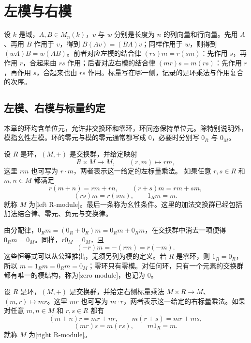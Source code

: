 
\section{左模与右模}
\label{b2:sec:0201}

设 \(k\) 是域，\(A,B\in M_n(k)\)，\(v\) 与 \(w\) 分别是长度为 \(n\) 的列向量和行向量。先用 \(A\)、再用 \(B\) 作用于 \(v\)，得到 \(B(Av)=(BA)v\)；同样作用于 \(w\)，则得到 \((wA)B=w(AB)\)。前者对应左模的结合律 \((rs)m=r(sm)\)：先作用 \(s\)，再作用 \(r\)，合起来由 \(rs\) 作用；后者对应右模的结合律 \((mr)s=m(rs)\)：先作用 \(r\)，再作用 \(s\)，合起来也由 \(rs\) 作用。标量写在哪一侧，记录的是环乘法与作用复合的次序。


\subsection{左模、右模与标量约定}
\label{b2:subsec:0201:01}

本章的环均含单位元，允许非交换环和零环，环同态保持单位元。除特别说明外，模指幺性左模。环的零元与模的零元通常都写成 \(0\)，必要时分别写 \(0_R\) 与 \(0_M\)。

\begin{definition}\label{b2:def:left-module}
	设 \(R\) 是环，\((M,+)\) 是交换群，并给定映射
	\[
		R\times M\longrightarrow M,\qquad (r,m)\longmapsto rm,
	\]
	这里 \(rm\) 也可写为 \(r\cdot m\)，两者表示这一给定的左标量乘法。 如果任意 \(r,s\in R\) 和 \(m,n\in M\) 都满足
	\[
		r(m+n)=rm+rn,\qquad (r+s)m=rm+sm,
	\]
	\[
		(rs)m=r(sm),\qquad 1_Rm=m.
	\]
	就称 \(M\) 为[left R-module]。最后一条称为幺性条件。这里的加法交换群已经包括加法结合律、零元、负元与交换律。
\end{definition}

由分配律，\(0_Rm=(0_R+0_R)m=0_Rm+0_Rm\)，在交换群中消去一项便得 \(0_Rm=0_M\)。同样，\(r0_M=0_M\)，且
\[
	(-r)m=-(rm)=r(-m).
\]
这些恒等式可以从公理推出，无须另列为模的定义。若 \(R\) 是零环，则 \(1_R=0_R\)，所以 \(m=1_Rm=0_Rm=0_M\)；零环只有零模。对任何环，只有一个元素的交换群都有唯一的模结构，称为[zero module]，也记为 \(0\)。

\begin{definition}\label{b2:def:right-module}
	设 \(R\) 是环，\((M,+)\) 是交换群，并给定右侧标量乘法 \(M\times R\to M\)、\((m,r)\mapsto mr\)。这里 \(mr\) 也可写为 \(m\cdot r\)，两者表示这一给定的右标量乘法。如果对任意 \(m,n\in M\) 和 \(r,s\in R\) 都有
	\[
		(m+n)r=mr+nr,\qquad m(r+s)=mr+ms,
	\]
	\[
		(mr)s=m(rs),\qquad m1_R=m.
	\]
	就称 \(M\) 为[right R-module]。
\end{definition}

